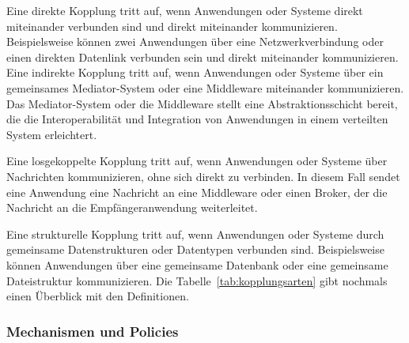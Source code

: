 \documentclass[../vs-script-first-v01.tex]{subfiles}
\begin{document}
Eine direkte Kopplung tritt auf, wenn Anwendungen oder Systeme direkt miteinander verbunden sind und direkt miteinander kommunizieren. Beispielsweise können zwei Anwendungen über eine Netzwerkverbindung oder einen direkten Datenlink verbunden sein und direkt miteinander kommunizieren.
\\
Eine indirekte Kopplung tritt auf, wenn Anwendungen oder Systeme über ein gemeinsames Mediator-System oder eine Middleware miteinander kommunizieren. Das Mediator-System oder die Middleware stellt eine Abstraktionsschicht bereit, die die Interoperabilität und Integration von Anwendungen in einem verteilten System erleichtert.

Eine losgekoppelte Kopplung tritt auf, wenn Anwendungen oder Systeme über Nachrichten kommunizieren, ohne sich direkt zu verbinden. In diesem Fall sendet eine Anwendung eine Nachricht an eine Middleware oder einen Broker, der die Nachricht an die Empfängeranwendung weiterleitet.

Eine strukturelle Kopplung tritt auf, wenn Anwendungen oder Systeme durch gemeinsame Datenstrukturen oder Datentypen verbunden sind. Beispielsweise können Anwendungen über eine gemeinsame Datenbank oder eine gemeinsame Dateistruktur kommunizieren. Die Tabelle~\ref{tab:kopplungsarten} gibt nochmals einen Überblick mit den Definitionen. 

\subsubsection{Mechanismen und Policies}
\end{document}
